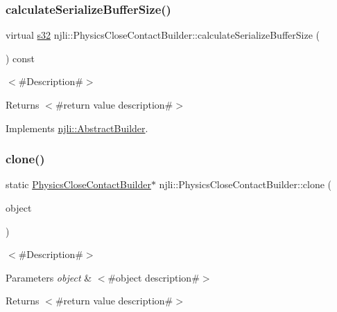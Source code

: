 \subsubsection{\texorpdfstring{calculate\+Serialize\+Buffer\+Size()}{calculateSerializeBufferSize()}}
{\footnotesize\ttfamily virtual \mbox{\hyperlink{_util_8h_aa62c75d314a0d1f37f79c4b73b2292e2}{s32}} njli\+::\+Physics\+Close\+Contact\+Builder\+::calculate\+Serialize\+Buffer\+Size (\begin{DoxyParamCaption}{ }\end{DoxyParamCaption}) const\hspace{0.3cm}{\ttfamily [virtual]}}

$<$\#\+Description\#$>$

\begin{DoxyReturn}{Returns}
$<$\#return value description\#$>$ 
\end{DoxyReturn}


Implements \mbox{\hyperlink{classnjli_1_1_abstract_builder_aa1d220053e182c37b31b427499c6eacf}{njli\+::\+Abstract\+Builder}}.

\mbox{\label{classnjli_1_1_physics_close_contact_builder_a0879ce808e41a39aaae70da300a730f1}} 
\subsubsection{\texorpdfstring{clone()}{clone()}}
{\footnotesize\ttfamily static \mbox{\hyperlink{classnjli_1_1_physics_close_contact_builder}{Physics\+Close\+Contact\+Builder}}$\ast$ njli\+::\+Physics\+Close\+Contact\+Builder\+::clone (\begin{DoxyParamCaption}\item[{const \mbox{\hyperlink{classnjli_1_1_physics_close_contact_builder}{Physics\+Close\+Contact\+Builder}} \&}]{object }\end{DoxyParamCaption})\hspace{0.3cm}{\ttfamily [static]}}

$<$\#\+Description\#$>$


\begin{DoxyParams}{Parameters}
{\em object} & $<$\#object description\#$>$\\
\hline
\end{DoxyParams}
\begin{DoxyReturn}{Returns}
$<$\#return value description\#$>$ 
\end{DoxyReturn}
\mbox{\label{classnjli_1_1_physics_close_contact_builder_afa51854834987b555e41b0c10c74c180}} 
